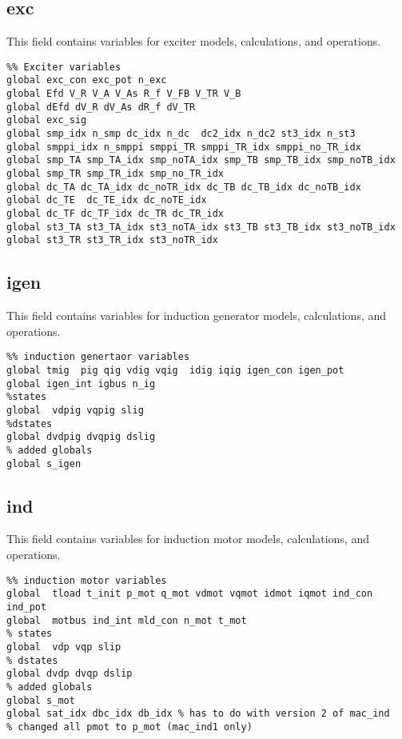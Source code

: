 \subsection{exc}
This field contains variables for exciter models, calculations, and operations.
\begin{verbatim}
%% Exciter variables
global exc_con exc_pot n_exc
global Efd V_R V_A V_As R_f V_FB V_TR V_B
global dEfd dV_R dV_As dR_f dV_TR
global exc_sig 
global smp_idx n_smp dc_idx n_dc  dc2_idx n_dc2 st3_idx n_st3
global smppi_idx n_smppi smppi_TR smppi_TR_idx smppi_no_TR_idx 
global smp_TA smp_TA_idx smp_noTA_idx smp_TB smp_TB_idx smp_noTB_idx
global smp_TR smp_TR_idx smp_no_TR_idx 
global dc_TA dc_TA_idx dc_noTR_idx dc_TB dc_TB_idx dc_noTB_idx
global dc_TE  dc_TE_idx dc_noTE_idx
global dc_TF dc_TF_idx dc_TR dc_TR_idx
global st3_TA st3_TA_idx st3_noTA_idx st3_TB st3_TB_idx st3_noTB_idx
global st3_TR st3_TR_idx st3_noTR_idx
\end{verbatim}

\subsection{igen}
This field contains variables for induction generator models, calculations, and operations.
\begin{verbatim}
%% induction genertaor variables 
global tmig  pig qig vdig vqig  idig iqig igen_con igen_pot
global igen_int igbus n_ig
%states
global  vdpig vqpig slig
%dstates
global dvdpig dvqpig dslig
% added globals
global s_igen
\end{verbatim}


\subsection{ind}
This field contains variables for induction motor models, calculations, and operations.
\begin{verbatim}
%% induction motor variables
global  tload t_init p_mot q_mot vdmot vqmot idmot iqmot ind_con ind_pot
global  motbus ind_int mld_con n_mot t_mot
% states
global  vdp vqp slip
% dstates
global dvdp dvqp dslip
% added globals
global s_mot
global sat_idx dbc_idx db_idx % has to do with version 2 of mac_ind
% changed all pmot to p_mot (mac_ind1 only)
\end{verbatim}

